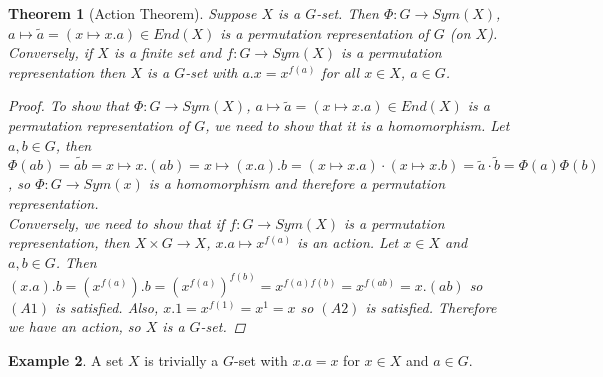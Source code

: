\documentclass[12pt]{amsart}
\newtheorem{theorem}{Theorem}[section]
\theoremstyle{definition}
\newtheorem{example}[theorem]{Example}
\begin{document}
\begin{theorem}[Action Theorem]
Suppose $X$ is a $G$-set.  Then $\Phi:G\rightarrow Sym(X)$, $a\mapsto\tilde{a}=(x\mapsto x.a)\in End(X)$ is a permutation representation of $G$ (on $X$).  Conversely, if $X$ is a finite set and $f:G\rightarrow Sym(X)$ is a permutation representation then $X$ is a $G$-set with $a.x=x^{f(a)}$ for all $x\in X$, $a\in G$.

\begin{proof}
To show that $\Phi:G\rightarrow Sym(X)$, $a\mapsto\tilde{a}=(x\mapsto x.a)\in End(X)$ is a permutation representation of $G$, we need to show that it is a homomorphism.  Let $a, b\in G$, then $\Phi(ab)=\widetilde{ab}=x\mapsto x.(ab)=x\mapsto(x.a).b=(x\mapsto x.a)\cdot(x\mapsto x.b)=\tilde{a}\cdot\tilde{b}=\Phi(a)\Phi(b)$, so $\Phi:G\rightarrow Sym(x)$ is a homomorphism and therefore a permutation representation.\\
Conversely, we need to show that if $f:G\rightarrow Sym(X)$ is a permutation representation, then $X\times G\rightarrow X$, $x.a\mapsto x^{f(a)}$ is an action.  Let $x\in X$ and $a, b\in G$.  Then $(x.a).b=(x^{f(a)}).b=(x^{f(a)})^{f(b)}=x^{f(a)f(b)}=x^{f(ab)}=x.(ab)$ so $(A1)$ is satisfied.  Also, $x.1=x^{f(1)}=x^1=x$ so $(A2)$ is satisfied.  Therefore we have an action, so $X$ is a $G$-set.
\end{proof}
\end{theorem}

\begin{example}
A set $X$ is trivially a $G$-set with $x.a=x$ for $x\in X$ and $a\in G$.
\end{example}

\nocite{*}




\end{document}
